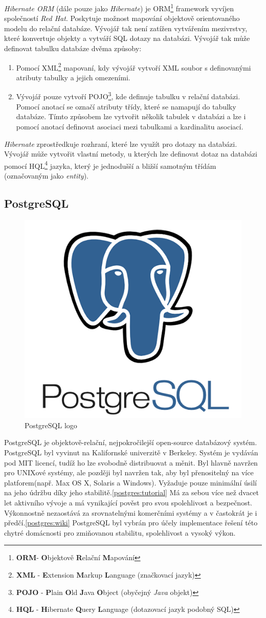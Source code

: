 \emph{Hibernate ORM} (dále pouze jako \emph{Hibernate}) je ORM\footnote{\textbf{ORM}- \textbf{O}bjektově \textbf{R}elační \textbf{M}apování} framework vyvíjen společností \emph{Red Hat}.
Poskytuje možnost mapování objektově orientovaného modelu do relační databáze. Vývojář tak není zatížen vytvářením mezivrstvy, které konvertuje objekty a vytváří SQL dotazy na databázi.
Vývojář tak může definovat tabulku databáze dvěma způsoby:
\begin{enumerate}
  \item Pomocí XML\footnote{\textbf{XML} - \textbf{E}xtension \textbf{M}arkup \textbf{L}anguage (značkovací jazyk)} mapovaní, kdy vývojář vytvoří XML soubor s definovanými atributy tabulky a jejich omezeními.
  \item Vývojář pouze vytvoří POJO\footnote{\textbf{POJO} - \textbf{P}lain \textbf{O}ld \textbf{J}ava \textbf{O}bject (obyčejný \emph{Java} objekt)}, kde definuje tabulku v relační databázi. Pomocí anotací se označí atributy třídy, které se namapují do tabulky databáze.
        Tímto způsobem lze vytvořit několik tabulek v databázi a lze i pomocí anotací definovat asociaci mezi tabulkami a kardinalitu asociací.
\end{enumerate}
\emph{Hibernate} zprostředkuje rozhraní, které lze využít pro dotazy na databázi. Vývojář může vytvořit vlastní metody, u kterých lze definovat dotaz na databázi pomocí HQL\footnote{\textbf{HQL} - \textbf{H}ibernate \textbf{Q}uery \textbf{L}anguage (dotazovací jazyk podobný SQL)} jazyka,
který je jednodušší a bližší samotným třídám (označovaným jako \emph{entity}).

\subsection*{PostgreSQL}
\label{pouzite:postgresql}
\begin{figure}[hbt]
  \centering
  \includegraphics[width=.2 \linewidth]{obrazky-figures/postgresql-logo.png}
  \caption{PostgreSQL logo}
\end{figure}

PostgreSQL je objektově-relační, nejpokročilejší open-source databázový systém.
PostgreSQL byl vyvinut na Kalifornské univerzitě v Berkeley.
Systém je vydáván pod MIT licencí, tudíž ho lze svobodně distribuovat a měnit.
Byl hlavně navržen pro UNIXové systémy, ale později byl navržen tak, aby byl přenositelný na více platforem(např. Max OS X, Solaris a Windows).
Vyžaduje pouze minimální úsilí na jeho údržbu díky jeho stabilitě.\ref{postgres:tutorial}
Má za sebou více než dvacet let aktivního vývoje a má vynikající pověst pro svou spolehlivost a bezpečnost.
Výkonnostně nezaostává za srovnatelnými komerčními systémy a v častokrát je i předčí.\ref{postgres:wiki}
PostgreSQL byl vybrán pro účely implementace řešení této chytré domácnosti pro zmiňovanou stabilitu, spolehlivost a vysoký výkon.

